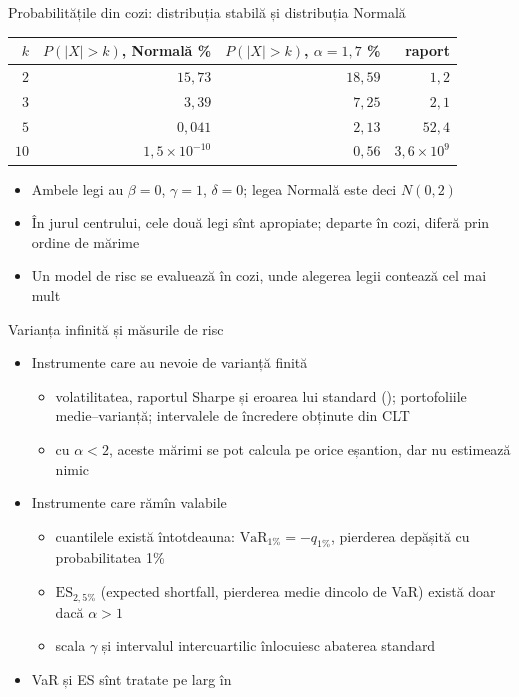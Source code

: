 \begin{frame}{Probabilitățile din cozi: distribuția stabilă și distribuția Normală}
\itemsize{\small}
\begin{center}
\footnotesize
\begin{tabular}{rrrr}
\toprule
$k$ & $P(|X| > k)$, Normală \% & $P(|X| > k)$, $\alpha = 1{,}7$ \% & raport \\
\midrule
$2$ & $15{,}73$ & $18{,}59$ & $1{,}2$ \\
$3$ & $3{,}39$ & $7{,}25$ & $2{,}1$ \\
$5$ & $0{,}041$ & $2{,}13$ & $52{,}4$ \\
$10$ & $1{,}5\times 10^{-10}$ & $0{,}56$ & $3{,}6\times 10^{9}$ \\
\bottomrule
\end{tabular}
\end{center}
\begin{itemize}
    \item Ambele legi au $\beta = 0$, $\gamma = 1$, $\delta = 0$; legea Normală este deci $N(0, 2)$
    \item În jurul centrului, cele două legi sînt apropiate; departe în cozi, diferă prin ordine de mărime
    \item Un model de risc se evaluează în cozi, unde alegerea legii contează cel mai mult
\end{itemize}
\end{frame}

\begin{frame}{Varianța infinită și măsurile de risc}
\itemsize{\small}
\begin{itemize}
    \item Instrumente care au nevoie de varianță finită
    \begin{itemize}
        \item volatilitatea, raportul Sharpe și eroarea lui standard (); portofoliile medie--varianță; intervalele de încredere obținute din CLT
        \item cu $\alpha < 2$, aceste mărimi se pot calcula pe orice eșantion, dar nu estimează nimic
    \end{itemize}
    \item Instrumente care rămîn valabile
    \begin{itemize}
        \item cuantilele există întotdeauna: $\mathrm{VaR}_{1\%} = -q_{1\%}$, pierderea depășită cu probabilitatea 1\%
        \item $\mathrm{ES}_{2{,}5\%}$ (expected shortfall, pierderea medie dincolo de VaR) există doar dacă $\alpha > 1$
        \item scala $\gamma$ și intervalul intercuartilic înlocuiesc abaterea standard
    \end{itemize}
    \item VaR și ES sînt tratate pe larg în 
\end{itemize}
\end{frame}

